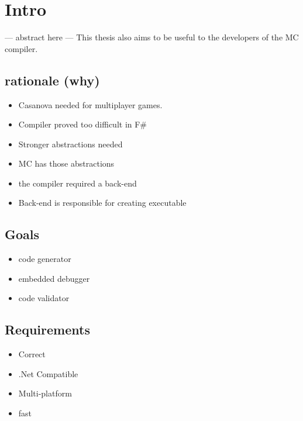\section{Intro}
--- abstract here ---
This thesis also aims to be useful to the developers of the MC compiler.

\subsection{rationale (why)}
\begin{itemize}
    \item Casanova needed for multiplayer games.
    \item Compiler proved too difficult in F\#
    \item Stronger abstractions needed
    \item MC has those abstractions
    \item the compiler required a back-end
    \item Back-end is responsible for creating executable
\end{itemize}

\subsection{Goals}
\begin{itemize}
    \item code generator
    \item embedded debugger
    \item code validator
\end{itemize}

\subsection{Requirements}
\begin{itemize}
    \item Correct
    \item .Net Compatible
    \item Multi-platform
    \item fast
\end{itemize}
